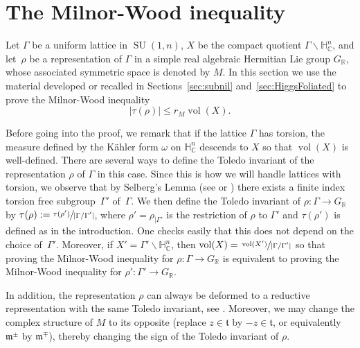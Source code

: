 \documentclass[JEP,XML,SOM,Unicode,NoFloatCountersInSection]{cedram}
\newcommand{\citestar}[3]{\cite[#3]{#1}}
\theoremstyle{plain}
\theoremstyle{definition}
\DeclareMathOperator{\SU}{SU}
\DeclareMathOperator{\vol}{vol}
\newcommand{\bR}{\mathbb{R}}
\newcommand{\HC}{{\mathbb{H}^n_\mathbb{C}}}
\newcommand{\fm}{\mathfrak{m}}
\newcommand{\ft}{\mathfrak{t}}
\newcommand{\rkm}{{r_M}}
\begin{document}
\vspace*{-\baselineskip}\vskip0pt
\section{The Milnor-Wood inequality}
\label{sec:MW}

Let $\Gamma$ be a uniform lattice in $\SU(1,n)$, $X$ be the compact quotient $\Gamma\backslash\HC$, and let~$\rho$
be a representation of $\Gamma$ in a simple real algebraic Hermitian Lie group $G_\bR$, whose associated
symmetric space is denoted by $M$. In this section we use
the material developed or recalled in Sections~\ref{sec:subnil} and~\ref{sec:HiggsFoliated}
to prove the Milnor-Wood inequality
$$
|\tau(\rho)|\leq \rkm\vol(X).
$$

Before going into the proof, we remark that if the lattice $\Gamma$ has torsion, the measure defined by
the Kähler form $\omega$ on $\HC$ descends to $X$ so that $\vol(X)$ is well-defined.
There are several ways to define the Toledo invariant of the representation $\rho$ of $\Gamma$ in
this case. Since this is how we will handle lattices with torsion, we observe that by
Selberg's Lemma (see \citestar{ratcliffe}*{p.\,327} or \cite{selberg}) there exists a finite index
torsion free subgroup~$\Gamma'$ of~$\Gamma$. We then define the Toledo invariant of $\rho:\Gamma\to
G_\bR$ by \hbox{$\tau(\rho):= \sfrac{\tau(\rho')}{|\Gamma/\Gamma'|}$}, where $\rho'=\rho_{|\Gamma'}$ is the restriction of $\rho$ to
$\Gamma'$ and $\tau(\rho')$ is defined as in the introduction. One checks easily that this does not depend
on the choice of~$\Gamma'$. Moreover, if
$X'=\Gamma'\backslash\HC$, then $\vol(X)=\sfrac{\vol(X')}{|\Gamma/\Gamma'|}$ so that proving the Milnor-Wood
inequality for $\rho:\Gamma\to G_\bR$ is equivalent to proving the Milnor-Wood inequality for $\rho':\Gamma'\to
G_\bR$.

In addition, the representation $\rho$ can always be deformed to a
reductive representation with the same Toledo invariant, see \eg \citestar{KM}*{Lem.\,4.11}. Moreover,
we may change the complex structure of $M$ to its opposite (\ie replace $z\in\ft$ by $-z\in\ft$, or
equivalently $\fm^\pm$ by $\fm^{\mp}$), thereby changing the sign of the Toledo
invariant of $\rho$.
\end{document}
